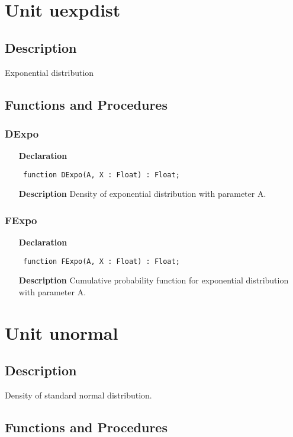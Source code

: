 \documentclass[12pt,a4paper,oneside]{report}
\newcommand{\declarationitem}[1]{\textbf{#1}}
\newcommand{\descriptiontitle}[1]{\textbf{#1}}
\newcommand{\code}[1]{\texttt{#1}}
\begin{document}
\section{Unit uexpdist}
\label{uexpdist}
\subsection{Description}
Exponential distribution 
\subsection{Functions and Procedures}
\subsubsection{DExpo}
\label{uexpdist-DExpo}
\begin{itemize}\item[\declarationitem{Declaration}\hfill]
	\begin{flushleft}
		\code{
			function DExpo(A, X : Float) : Float;}
	\end{flushleft}
	\item[\descriptiontitle{Description}]
	Density of exponential distribution with parameter A.
\end{itemize}
\subsubsection{FExpo}
\label{uexpdist-FExpo}
\begin{itemize}\item[\declarationitem{Declaration}\hfill]
	\begin{flushleft}
		\code{
			function FExpo(A, X : Float) : Float;}
	\end{flushleft}
	\item[\descriptiontitle{Description}]
	Cumulative probability function for exponential distribution with parameter A.
\end{itemize}
\section{Unit unormal}
\label{unormal}
\subsection{Description}
Density of standard normal distribution. 
\subsection{Functions and Procedures}
\end{document}

